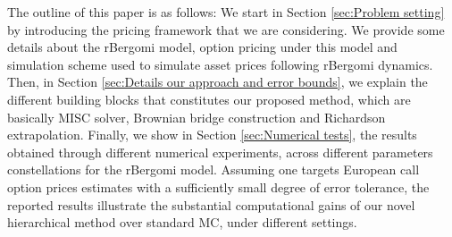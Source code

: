 The outline of this paper is as follows: We start in Section \ref{sec:Problem setting} by  introducing  the pricing framework that we are considering. We provide some details about the rBergomi model, option pricing under this model and simulation scheme used to simulate asset prices following rBergomi dynamics. Then, in Section \ref{sec:Details our approach and error bounds}, we explain the different building blocks that constitutes our proposed method, which are basically MISC solver, Brownian bridge construction and Richardson extrapolation. Finally, we show in Section \ref{sec:Numerical tests}, the results obtained through different numerical experiments, across different parameters constellations for the rBergomi model. Assuming one targets European call option prices estimates with a sufficiently small degree of error tolerance, the reported results   illustrate the substantial computational gains of our novel hierarchical method over standard MC, under different settings. 


